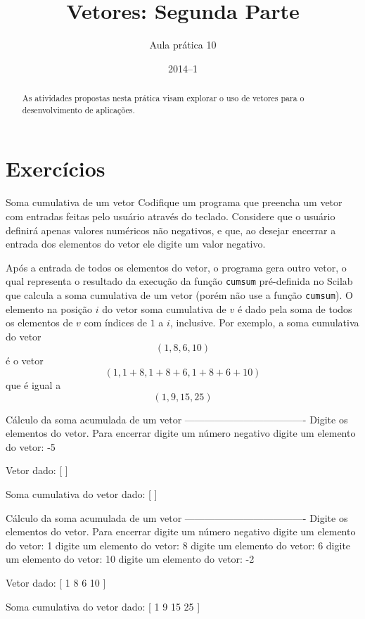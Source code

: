 \documentclass[11pt]{practice}
\begin{document}
\subtitle{Aula prática 10}
\title{Vetores: Segunda Parte}
\author{}
\date{2014--1}
\maketitle

\begin{abstract}
  As atividades propostas nesta prática visam explorar o uso de vetores
  para o desenvolvimento de aplicações.
\end{abstract}

\tableofcontents

\section{Exercícios}

\begin{task}[breakable]{Soma cumulativa de um vetor}{}
  Codifique um programa que preencha um vetor com entradas feitas pelo
  usuário através do teclado. Considere que o usuário definirá apenas
  valores numéricos não negativos, e que, ao desejar encerrar a entrada
  dos elementos do vetor ele digite um valor negativo.

  Após a entrada de todos os elementos do vetor, o programa gera outro
  vetor, o qual representa o resultado da execução da função
  \texttt{cumsum} pré-definida no Scilab que calcula a soma cumulativa
  de um vetor (porém não use a função \texttt{cumsum}). O elemento na
  posição $i$ do vetor soma cumulativa de $v$ é dado pela soma de todos
  os elementos de $v$ com índices de $1$ a $i$, inclusive. Por exemplo,
  a soma cumulativa do vetor
  \[ (1, 8, 6, 10) \]
  é o vetor
  \[ (1, 1+8, 1+8+6, 1+8+6+10) \]
  que é igual a
  \[ (1, 9, 15, 25) \]

  \begin{runexample}
Cálculo da soma acumulada de um vetor
-------------------------------------
Digite os elementos do vetor.
Para encerrar digite um número negativo
  digite um elemento do vetor: -5

Vetor dado:
[ ]

Soma cumulativa do vetor dado:
[ ]
  \end{runexample}

  \begin{runexample}
Cálculo da soma acumulada de um vetor
-------------------------------------
Digite os elementos do vetor.
Para encerrar digite um número negativo
  digite um elemento do vetor: 1
  digite um elemento do vetor: 8
  digite um elemento do vetor: 6
  digite um elemento do vetor: 10
  digite um elemento do vetor: -2

Vetor dado:
[ 1 8 6 10 ]

Soma cumulativa do vetor dado:
[ 1 9 15 25 ]
  \end{runexample}

  \tcblower
  \solution
\end{task}
\end{document}
